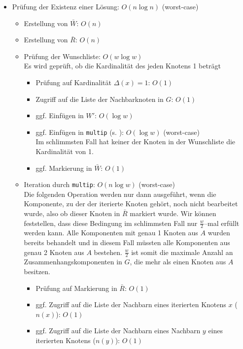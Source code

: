 \documentclass[a4paper,10pt,ngerman]{scrartcl}
\newcommand{\ttt}[1]{\texttt{#1}}
\begin{document}
\begin{itemize}
  \item Prüfung der Existenz einer Lösung: $O(n \log n)$ (worst-case)
  \begin{itemize}
    \item Erstellung von $\bar{W}$: $O(n)$

    \item Erstellung von $\bar{R}$: $O(n)$

    \item Prüfung der Wunschliste: $O(w \log w)$\\
    Es wird geprüft, ob die Kardinalität des jeden Knotens 1 beträgt
    \begin{itemize}
    \item Prüfung auf Kardinalität $\Delta(x) = 1$: $O(1)$
    \item Zugriff auf die Liste der Nachbarknoten in $G$: $O(1)$
    \item ggf. Einfügen in $W'$: $O(\log w)$
    \item ggf. Einfügen in \ttt{multip} (s. ): $O(\log w)$ (worst-case)\\
    Im schlimmsten Fall hat keiner der Knoten in der Wunschliste die Kardinalität von 1.
    \item ggf. Markierung in $\bar{W}$: $O(1)$
    \end{itemize}

    \item Iteration durch \ttt{multip}: $O(n \log w)$ (worst-case)\\
    Die folgenden Operation werden nur dann ausgeführt, wenn die Komponente,
    zu der der iterierte Knoten gehört, noch nicht bearbeitet wurde, also 
    ob dieser Knoten in $\bar{R}$ markiert wurde. Wir können feststellen, 
    dass diese Bedingung im schlimmsten Fall nur $\frac{w}{2}$--mal erfüllt werden kann.
    Alle Komponenten mit genau 1 Knoten aus $A$ wurden bereits behandelt und in diesem
    Fall müssten alle Komponenten aus genau 2 Knoten aus $A$ bestehen.
    $\frac{w}{2}$ ist somit die maximale Anzahl an Zusammenhangskomponenten in $G$,
    die mehr als einen Knoten aus $A$ besitzen.
    \begin{itemize}
    \item Prüfung auf Markierung in $\bar{R}$: $O(1)$

    \item ggf. Zugriff auf die Liste der Nachbarn eines iterierten Knotens $x$ ($n(x)$): $O(1)$

    \item ggf. Zugriff auf die Liste der Nachbarn eines Nachbarn $y$ eines iterierten Knotens ($n(y)$): $O(1)$


\end{itemize}
\end{itemize}
\end{itemize}
\end{document}
